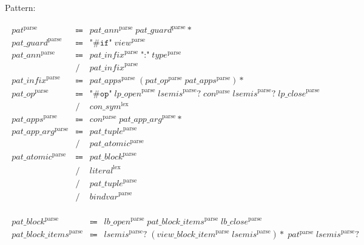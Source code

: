 Pattern:

\begin{align*}
    \begin{array}{rcll}
        \mathit{pat}^\mathrm{parse}
        &\Coloneq &\mathit{pat\_ann}^\mathrm{parse}\; \mathit{pat\_guard}^\mathrm{parse}{*} \\
        \mathit{pat\_guard}^\mathrm{parse}
        &\Coloneq &\texttt{"\#if"}\; \mathit{view}^\mathrm{parse} \\
        \mathit{pat\_ann}^\mathrm{parse}
        &\Coloneq &\mathit{pat\_infix}^\mathrm{parse}\; \texttt{":"}\; \mathit{type}^\mathrm{parse} \\
        &\mathrel{/} &\mathit{pat\_infix}^\mathrm{parse} \\
        \mathit{pat\_infix}^\mathrm{parse}
        &\Coloneq &\mathit{pat\_apps}^\mathrm{parse}\; (\mathit{pat\_op}^\mathrm{parse}\; \mathit{pat\_apps}^\mathrm{parse}){*} \\
        \mathit{pat\_op}^\mathrm{parse}
        &\Coloneq &\texttt{"\#op"}\; \mathit{lp\_open}^\mathrm{parse}\; \mathit{lsemis}^\mathrm{parse}{?}\; \mathit{con}^\mathrm{parse}\; \mathit{lsemis}^\mathrm{parse}{?}\; \mathit{lp\_close}^\mathrm{parse} \\
        &\mathrel{/} &\mathit{con\_sym}^\mathrm{lex} \\
        \mathit{pat\_apps}^\mathrm{parse}
        &\Coloneq &\mathit{con}^\mathrm{parse}\; \mathit{pat\_app\_arg}^\mathrm{parse}{*} \\
        \mathit{pat\_app\_arg}^\mathrm{parse}
        &\Coloneq &\mathit{pat\_tuple}^\mathrm{parse} \\
        &\mathrel{/} &\mathit{pat\_atomic}^\mathrm{parse} \\
        \mathit{pat\_atomic}^\mathrm{parse}
        &\Coloneq &\mathit{pat\_block}^\mathrm{parse} \\
        &\mathrel{/} &\mathit{literal}^\mathrm{lex} \\
        &\mathrel{/} &\mathit{pat\_tuple}^\mathrm{parse} \\
        &\mathrel{/} &\mathit{bindvar}^\mathrm{parse}
    \end{array}
\end{align*}

\begin{align*}
    \begin{array}{rcll}
        \mathit{pat\_block}^\mathrm{parse}
        &\Coloneq &\mathit{lb\_open}^\mathrm{parse}\; \mathit{pat\_block\_items}^\mathrm{parse}\; \mathit{lb\_close}^\mathrm{parse} \\
        \mathit{pat\_block\_items}^\mathrm{parse}
        &\Coloneq &\mathit{lsemis}^\mathrm{parse}{?}\; (\mathit{view\_block\_item}^\mathrm{parse}\; \mathit{lsemis}^\mathrm{parse}){*}\; \mathit{pat}^\mathrm{parse}\; \mathit{lsemis}^\mathrm{parse}{?}
    \end{array}
\end{align*}


